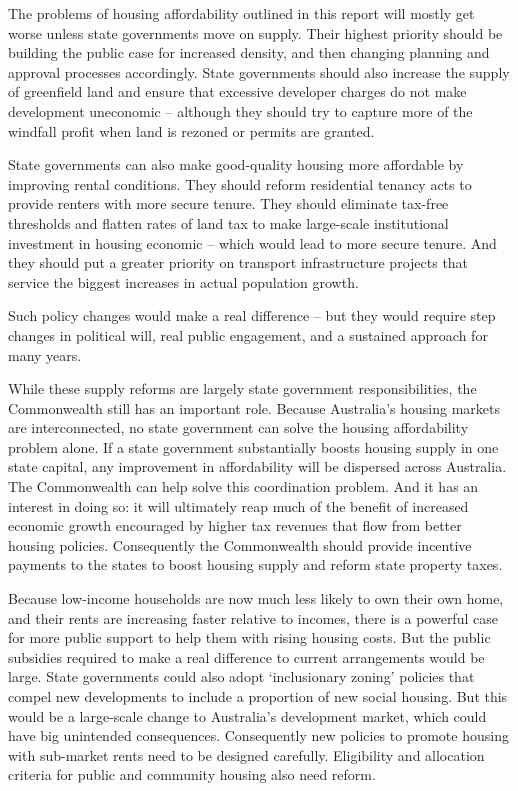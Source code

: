 The problems of housing affordability outlined in this report will mostly get worse unless state governments move on supply. Their highest priority should be building the public case for increased density, and then changing planning and approval processes accordingly.
State governments should also increase the supply of greenfield land and ensure that excessive developer charges do not make development uneconomic -- although they should try to capture more of the windfall profit when land is rezoned or permits are granted.

State governments can also make good-quality housing more affordable by improving rental conditions.
They should reform residential tenancy acts to provide renters with more secure tenure.
They should eliminate tax-free thresholds and flatten rates of land tax to make large-scale institutional investment in housing economic -- which would lead to more secure tenure.
And they should put a greater priority on transport infrastructure projects that service the biggest increases in actual population growth.

Such policy changes would make a real difference -- but they would require step changes in political will, real public engagement, and a sustained approach for many years.

While these supply reforms are largely state government responsibilities, the Commonwealth still has an important role.
Because Australia's housing markets are interconnected, no state government can solve the housing affordability problem alone.
If a state government substantially boosts housing supply in one state capital, any improvement in affordability will be dispersed across Australia.
The Commonwealth can help solve this coordination problem.
And it has an interest in doing so: it will ultimately reap much of the benefit of increased economic growth encouraged by higher tax revenues that flow from better housing policies.
Consequently the Commonwealth should provide incentive payments to the states to boost housing supply and reform state property taxes.

Because low-income households are now much less likely to own their own home, and their rents are increasing faster relative to incomes, there is a powerful case for more public support to help them with rising housing costs.
But the public subsidies required to make a real difference to current arrangements would be large.
State governments could also adopt `inclusionary zoning' policies that compel new developments to include a proportion of new social housing.
But this would be a large-scale change to Australia's development market, which could have big unintended consequences.
Consequently new policies to promote housing with sub-market rents need to be designed carefully.
Eligibility and allocation criteria for public and community housing also need reform.

